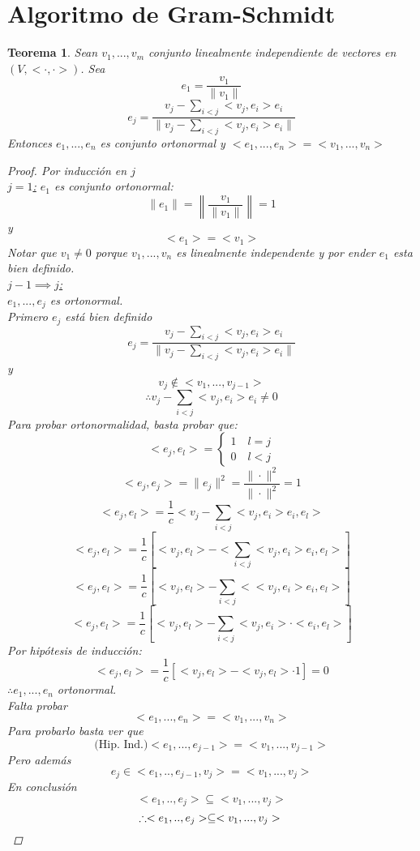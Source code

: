 \documentclass[11pt]{book}
\newtheorem{thm}{Teorema}[section]
\theoremstyle{definition}
\begin{document}
\section{Algoritmo de Gram-Schmidt}
\begin{thm}
	Sean $v_1,...,v_m$ conjunto linealmente independiente de vectores en $(V,<\cdot,\cdot>)$. Sea
	\[e_1=\frac{v_1}{\|v_1\|}\]
	\[e_j=\frac{v_j-\sum_{i<j}<v_j,e_i>e_i}{\|v_j-\sum_{i<j}<v_j,e_i>e_i\|}\]
	Entonces $e_1,...,e_n$ es conjunto ortonormal y $<e_1,...,e_n>=<v_1,...,v_n>$
	\begin{proof}
		Por inducción en $j$\\
		\underline{$j=1$:} $e_1$ es conjunto ortonormal:
		\[\|e_1\|=\left\|\frac{v_1}{\|v_1\|}\right\|=1\]
		y
		\[<e_1>=<v_1>\]
		Notar que $v_1\neq 0$ porque $v_1,...,v_n$ es linealmente independente y por ender $e_1$ esta bien definido.\\
		\underline{$j-1\implies j$:}\\
		$e_1,...,e_j$ es ortonormal.\\
		Primero $e_j$ está bien definido
		\[e_j=\frac{v_j-\sum_{i<j}<v_j,e_i>e_i}{\|v_j-\sum_{i<j}<v_j,e_i>e_i\|}\]
		y
		\[v_j\notin <v_1,...,v_{j-1}>\]
		\[\therefore v_j-\sum_{i<j}<v_j,e_i>e_i\neq 0\]
		Para probar ortonormalidad, basta probar que:
		\[<e_j,e_l>=\begin{cases}
			1\quad l=j\\
			0\quad l<j
		\end{cases}\]
		\[<e_j,e_j>=\|e_j\|^2=\frac{\|\cdot\|^2}{\|\cdot\|^2}=1\]
		\[<e_j,e_l>=\frac{1}{c}<v_j-\sum_{i<j}<v_j,e_i>e_i,e_l>\]
		\[<e_j,e_l>=\frac{1}{c}\left[<v_j,e_l>-<\sum_{i<j}<v_j,e_i>e_i,e_l>\right]\]
		\[<e_j,e_l>=\frac{1}{c}\left[<v_j,e_l>-\sum_{i<j}<<v_j,e_i>e_i,e_l>\right]\]
		\[<e_j,e_l>=\frac{1}{c}\left[<v_j,e_l>-\sum_{i<j}<v_j,e_i>\cdot<e_i,e_l>\right]\]
		Por hipótesis de inducción:
		\[<e_j,e_l>=\frac{1}{c}\left[<v_j,e_l>-<v_j,e_l>\cdot 1\right]=0\]
		$\therefore e_1,...,e_n$ ortonormal.\\
		Falta probar
		\[<e_1,...,e_n>=<v_1,...,v_n>\]
		Para probarlo basta ver que
		\[\textrm{(Hip. Ind.)} <e_1,...,e_{j-1}>=<v_1,...,v_{j-1}>\]
		Pero además
		\[e_j\in<e_1,..,e_{j-1},v_j>=<v_1,...,v_j>\]
		En conclusión
		\[<e_1,..,e_j>\subseteq<v_1,...,v_j>\]
		\[\therefore<e_1,..,e_j>\subseteq<v_1,...,v_j>\qedhere\]
	\end{proof}
\end{thm}
\end{document}
